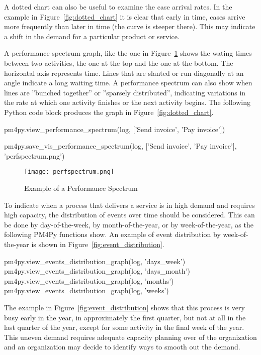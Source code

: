 A dotted chart can also be useful to examine the case arrival rates. In the example in Figure~\ref{fig:dotted_chart} it is clear that early in time, cases arrive more frequently than later in time (the curve is steeper there). This may indicate a shift in the demand for a particular product or service. 

A performance spectrum graph, like the one in Figure~\ref{fig:perf_spectrum} shows the wating times between two activities, the one at the top and the one at the bottom. The horizontal axis represents time. Lines that are slanted or run diagonally at an angle indicate a long waiting time. A performance spectrum can also show when lines are ''bunched together'' or ''sparsely distributed'', indicating variations in the rate at which one activity finishes or the next activity begins. The following Python code block produces the graph in Figure~\ref{fig:dotted_chart}.

\begin{pythoncode}
pm4py.view_performance_spectrum(log,
    ['Send invoice', 'Pay invoice'])

pm4py.save_vis_performance_spectrum(log,
    ['Send invoice', 'Pay invoice'],
    'perfspectrum.png') 
\end{pythoncode}

\begin{figure}
\centering
\texttt{[image: perfspectrum.png]}
\caption{Example of a Performance Spectrum}
\label{fig:perf_spectrum}
\end{figure}

To indicate when a process that delivers a service is in high demand and requires high capacity, the distribution of events over time should be considered. This can be done by day-of-the-week, by month-of-the-year, or by week-of-the-year, as the following PM4Py functions show. An example of event distribution by week-of-the-year is shown in Figure~\ref{fig:event_distribution}.

\begin{pythoncode}
pm4py.view_events_distribution_graph(log, 'days_week')
pm4py.view_events_distribution_graph(log, 'days_month')
pm4py.view_events_distribution_graph(log, 'months')
pm4py.view_events_distribution_graph(log, 'weeks')
\end{pythoncode}

The example in Figure~\ref{fig:event_distribution} shows that this process is very busy early in the year, in approximately the first quarter, but not at all in the last quarter of the year, except for some activity in the final week of the year. This uneven demand requires adequate capacity planning over of the organization and an organization may decide to identify ways to smooth out the demand. 

